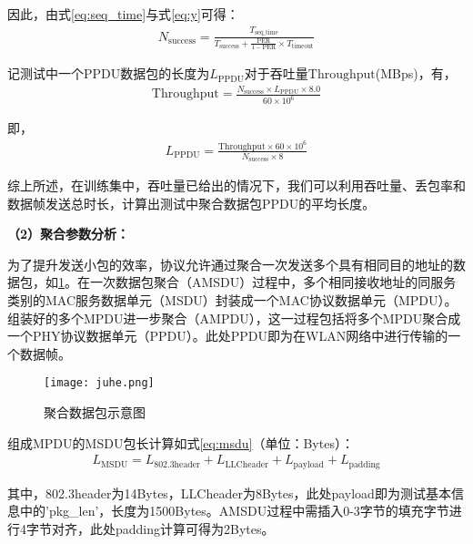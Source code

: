 \documentclass[bwprint]{gmcmthesis}
\begin{document}
因此，由式\ref{eq:seq_time}与式\ref{eq:y}可得：
\begin{align}
    N_{\text{success}} = \frac{T_{\text{seq\_time}}}{T_{\text{success}} + \frac{\text{PER}}{1-\text{PER}} \times T_{\text{timeout}}}  \label{eq:x}
    \end{align}

    记测试中一个PPDU数据包的长度为$L_{\text{PPDU}}$对于吞吐量$\text{Throughput}$(MBps)，有，
\begin{align}
    \text{Throughput} = \frac{N_{\text{success}} \times L_{\text{PPDU}} \times 8.0}{60 \times 10^6} \label{eq:throughput}
    \end{align}

即，
\begin{align}
    L_{\text{PPDU}} = \frac{\text{Throughput} \times 60 \times 10^6}{N_{\text{success}} \times 8} \label{eq:throughput}
    \end{align}

    综上所述，在训练集中，吞吐量已给出的情况下，我们可以利用吞吐量、丢包率和数据帧发送总时长，计算出测试中聚合数据包PPDU的平均长度。

\textbf{（2）聚合参数分析：}

为了提升发送小包的效率，协议允许通过聚合一次发送多个具有相同目的地址的数据包\cite{rn4}，如\ref{pho:juhe2}。在一次数据包聚合（AMSDU）过程中，多个相同接收地址的同服务类别的MAC服务数据单元（MSDU）封装成一个MAC协议数据单元（MPDU）。组装好的多个MPDU进一步聚合（AMPDU），这一过程包括将多个MPDU聚合成一个PHY协议数据单元（PPDU）。此处PPDU即为在WLAN网络中进行传输的一个数据帧。
\begin{figure}[!htbp]
    \centering
    \texttt{[image: juhe.png]}
    \caption{\centering 聚合数据包示意图}
    \label{pho:juhe2}
\end{figure}

组成MPDU的MSDU包长计算如式\ref{eq:msdu}（单位：Bytes）：
\begin{align}
    L_{\text{MSDU}} = L_{\text{802.3header}} + L_{\text{LLCheader}} + L_{\text{payload}} + L_{\text{padding}} \label{eq:msdu}
    \end{align}

其中，802.3header为14Bytes，LLCheader为8Bytes，此处payload即为测试基本信息中的'pkg\_len'，长度为1500Bytes。AMSDU过程中需插入0-3字节的填充字节进行4字节对齐，此处padding计算可得为2Bytes。   
\end{document}
